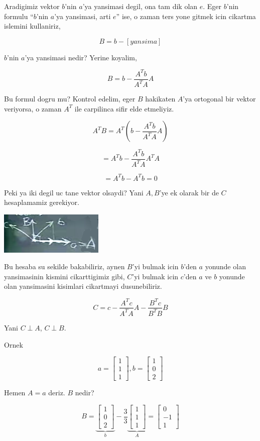 \documentclass[12pt,fleqn]{article}\usepackage{../common}
\begin{document}
Aradigimiz vektor $b$'nin $a$'ya yansimasi degil, ona tam dik olan
$e$. Eger $b$'nin formulu ``$b$'nin $a$'ya yansimasi, arti $e$'' ise, o
zaman ters yone gitmek icin cikartma islemini kullaniriz,

\[ B = b - [yansima] \]

$b$'nin $a$'ya yansimasi nedir? Yerine koyalim,

\[ B = b - \frac{ A^Tb}{A^TA}A \]

Bu formul dogru mu? Kontrol edelim, eger $B$ hakikaten $A$'ya ortogonal bir
vektor veriyorsa, o zaman $A^T$ ile carpilinca sifir elde etmeliyiz. 

\[ A^TB = A^T(b - \frac{ A^Tb}{A^TA}A) \]

\[ = A^Tb - \frac{ A^Tb}{A^TA}A^TA \]

\[ = A^Tb - A^Tb = 0 \]

Peki ya iki degil uc tane vektor olsaydi? Yani $A,B$'ye ek olarak bir de
$C$ hesaplamamiz gerekiyor. 

\includegraphics[height=2cm]{17_3.png}

Bu hesaba su sekilde bakabiliriz, aynen $B$'yi bulmak icin $b$'den $a$
yonunde olan yansimasinin kismini cikarttigimiz gibi, $C$'yi bulmak icin
$c$'den $a$ ve $b$ yonunde olan yansimasini kisimlari cikartmayi
dusunebiliriz.

\[ C = c - \frac{ A^Tc}{A^TA}A - \frac{ B^Tc}{B^TB}B \]

Yani $C \perp A$, $C \perp B$. 

Ornek

\[ 
a = 
\left[\begin{array}{r}
1 \\ 1 \\ 1
\end{array}\right],
b = 
\left[\begin{array}{r}
1 \\ 0 \\ 2
\end{array}\right]
 \]

Hemen $A = a$ deriz. $B$ nedir?

\[ 
B = 
\underbrace{
\left[\begin{array}{r}
1 \\ 0 \\ 2
\end{array}\right]}_{b}
-
\frac{ 3}{3}
\underbrace{
\left[\begin{array}{r}
1 \\ 1 \\ 1
\end{array}\right]}_{A}
=
\left[\begin{array}{r}
0 \\ -1 \\ 1
\end{array}\right]
 \]
\end{document}
